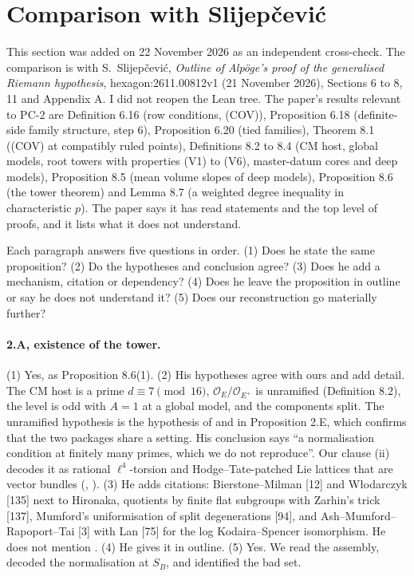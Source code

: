 \documentclass[11pt]{article}
\theoremstyle{remark}
\begin{document}
\section{Comparison with Slijepčević}\label{sec:slij}

This section was added on 22 November 2026 as an independent cross-check. The comparison is with S.~Slijepčević, \emph{Outline of Alpöge's proof of the generalised Riemann hypothesis}, hexagon:2611.00812v1 (21 November 2026), Sections 6 to 8, 11 and Appendix A. I did not reopen the Lean tree. The paper's results relevant to PC-2 are Definition 6.16 (row conditions, (COV)), Proposition 6.18 (definite-side family structure, step 6), Proposition 6.20 (tied families), Theorem 8.1 ((COV) at compatibly ruled points), Definitions 8.2 to 8.4 (CM host, global models, root towers with properties (V1) to (V6), master-datum cores and deep models), Proposition 8.5 (mean volume slopes of deep models), Proposition 8.6 (the tower theorem) and Lemma 8.7 (a weighted degree inequality in characteristic $p$). The paper says it has read statements and the top level of proofs, and it lists what it does not understand.

Each paragraph answers five questions in order. (1) Does he state the same proposition? (2) Do the hypotheses and conclusion agree? (3) Does he add a mechanism, citation or dependency? (4) Does he leave the proposition in outline or say he does not understand it? (5) Does our reconstruction go materially further?

\paragraph{2.A, existence of the tower.} (1) Yes, as Proposition 8.6(1). (2) His hypotheses agree with ours and add detail. The CM host is a prime $d\equiv7\pmod{16}$, $\mathcal O_E/\mathcal O_{E^+}$ is unramified (Definition 8.2), the level is odd with $A=1$ at a global model, and the components split. The unramified hypothesis is the hypothesis  of  and  in Proposition 2.E, which confirms that the two packages share a setting. His conclusion says ``a normalisation condition at finitely many primes, which we do not reproduce''. Our clause (ii) decodes it as rational $\ell^4$-torsion and Hodge--Tate-patched Lie lattices that are vector bundles (, ). (3) He adds citations: Bierstone--Milman [12] and W{\l}odarczyk [135] next to Hironaka, quotients by finite flat subgroups with Zarhin's trick [137], Mumford's uniformisation of split degenerations [94], and Ash--Mumford--Rapoport--Tai [3] with Lan [75] for the log Kodaira--Spencer isomorphism. He does not mention . (4) He gives it in outline. (5) Yes. We read the assembly, decoded the normalisation at $S_B$, and identified the bad set.
\end{document}
